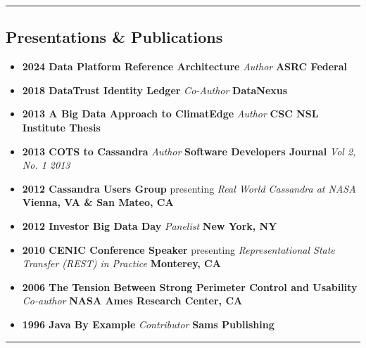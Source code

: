 \hrule
\vspace{-0.4em}

\subsection*{Presentations \& Publications}

\begin{itemize}
    \parskip=0.1em
    \item
    \headerrow
        {\textbf{2024 Data Platform Reference Architecture} {\emph{Author}} }
        {\textbf{ASRC Federal}}
    
    \item
    \headerrow
        {\textbf{2018 DataTrust Identity Ledger} {\emph{Co-Author}} }
        {\textbf{DataNexus}}

    \item
    \headerrow
        {\textbf{2013 A Big Data Approach to ClimatEdge\texttrademark} {\emph{Author}}}
        {\textbf{CSC NSL Institute Thesis}}

    \item
	\headerrow
		{\textbf{2013 COTS to Cassandra} {\emph{Author}}}
		{\textbf{Software Developers Journal} {\emph{Vol 2, No. 1 2013}}}

    \item
	\headerrow
		{\textbf{2012 Cassandra Users Group} presenting {\emph{Real World Cassandra at NASA}}}
		{\textbf{Vienna, VA \& San Mateo, CA}}

	\item
	\headerrow
		{\textbf{2012 Investor Big Data Day} {\emph{Panelist}}}
		{\textbf{New York, NY}}

	\item
    \headerrow
		{\textbf{2010 CENIC Conference Speaker} presenting {\emph{Representational State Transfer (REST) in Practice}}}
		{\textbf{Monterey, CA}}

	\item
	\headerrow
		{\textbf{2006 The Tension Between Strong Perimeter Control and Usability} {\emph{Co-author}}}
		{\textbf{NASA Ames Research Center, CA}}

	\item
	\headerrow
		{\textbf{1996 Java By Example} {\emph{Contributor}}}
		{\textbf{Sams Publishing}}

\end{itemize}


\hrule\
\vspace{-0.4em}
